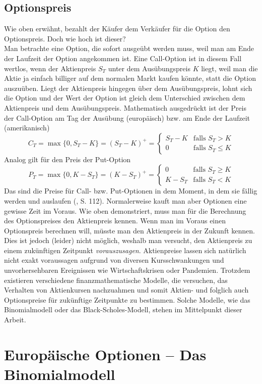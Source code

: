\documentclass[11pt]{report} %
\begin{document}
\section{Optionspreis}
Wie oben erwähnt, bezahlt der Käufer dem Verkäufer für die Option den Optionspreis. Doch wie hoch ist dieser?\\
Man betrachte eine Option, die sofort ausgeübt werden muss, weil man am Ende der Laufzeit der Option angekommen ist. Eine Call-Option ist in diesem Fall wertlos, wenn der Aktienpreis $S_T$ unter dem Ausübungspreis $K$ liegt, weil man die Aktie ja einfach billiger auf dem normalen Markt kaufen könnte, statt die Option auszuüben. Liegt der Aktienpreis hingegen über dem Ausübungspreis, lohnt sich die Option und der Wert der Option ist gleich dem Unterschied zwischen dem Aktienpreis und dem Ausübungspreis. Mathematisch ausgedrückt ist der Preis der Call-Option am Tag der Ausübung (europäisch) bzw. am Ende der Laufzeit (amerikanisch)
$$C_T=\max\{0, S_T-K\}=(S_T-K)^+=
\begin{cases}
  S_T-K & \text{falls } S_T>K\\  
  0 & \text{falls } S_T \le K
\end{cases}
$$
Analog gilt für den Preis der Put-Option
$$P_T=\max\{0, K-S_T\}=(K-S_T)^+=
\begin{cases}
  0 & \text{falls } S_T\geq K\\  
  K-S_T & \text{falls } S_T<K
\end{cases}
$$
Das sind die Preise für Call- bzw. Put-Optionen in dem Moment, in dem sie fällig werden und auslaufen (\cite{Adelmeyer2003}, S. 112). Normalerweise kauft man aber Optionen eine gewisse Zeit im Voraus. Wie oben demonstriert, muss man für die Berechnung des Optionspreises den Aktienpreis kennen. Wenn man im Voraus einen Optionspreis berechnen will, müsste man den Aktienpreis in der Zukunft kennen. Dies ist jedoch (leider) nicht möglich, weshalb man versucht, den Aktienpreis zu einem zukünftigen Zeitpunkt \textit{vorauszusagen}. Aktienpreise lassen sich natürlich nicht exakt voraussagen aufgrund von diversen Kursschwankungen und unvorhersehbaren Ereignissen wie Wirtschaftskrisen oder Pandemien. Trotzdem existieren verschiedene finanzmathematische Modelle, die versuchen, das Verhalten von Aktienkursen nachzuahmen und somit Aktien- und folglich auch Optionspreise für zukünftige Zeitpunkte zu bestimmen. Solche Modelle, wie das Binomialmodell oder das Black-Scholes-Modell, stehen im Mittelpunkt dieser Arbeit.

\chapter{Europäische Optionen -- Das Binomialmodell}
\end{document}
